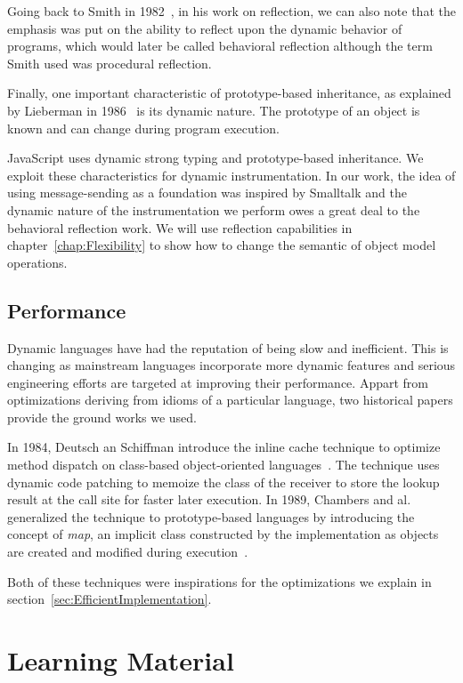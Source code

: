 Going back to Smith in 1982~\cite{Smith:1982}, in his work on reflection, we
can also note that the emphasis was put on the ability to reflect upon the
dynamic behavior of programs, which would later be called behavioral reflection
although the term Smith used was procedural reflection.

Finally, one important characteristic of prototype-based inheritance, as
explained by Lieberman in 1986~\cite{Lieberman:1986} is its dynamic nature. The
prototype of an object is known and can change during program execution.

JavaScript uses dynamic strong typing and prototype-based inheritance.  We
exploit these characteristics for dynamic instrumentation. In our work, the
idea of using message-sending as a foundation was inspired by Smalltalk  and
the dynamic nature of the instrumentation we perform owes a great deal to the
behavioral reflection work. We will use reflection capabilities in
chapter~\ref{chap:Flexibility} to show how to change the semantic of object
model operations.

\subsection{Performance}

Dynamic languages have had the reputation of being slow and inefficient. This
is changing as mainstream languages incorporate more dynamic features and
serious engineering efforts are targeted at improving their performance. Appart
from optimizations deriving from idioms of a particular language, two historical
papers provide the ground works we used.

In 1984, Deutsch an Schiffman introduce the inline cache technique to optimize
method dispatch on class-based object-oriented languages~\cite{Deutsch:1984}.
The technique uses dynamic code patching to memoize the class of the receiver
to store the lookup result at the call site for faster later execution. In
1989, Chambers and al. generalized the technique to prototype-based languages
by introducing the concept of \textit{map}, an implicit class constructed by
the implementation as objects are created and modified during
execution~\cite{self}.

Both of these techniques were inspirations for the optimizations we explain in
section~\ref{sec:EfficientImplementation}.

\section{Learning Material}


